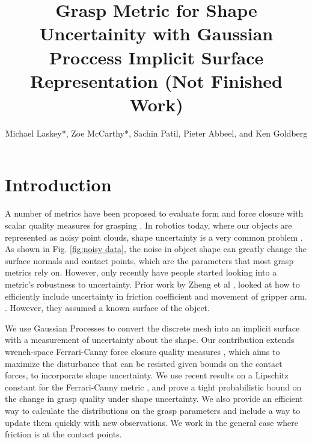 \documentclass[letterpaper, 10 pt, conference]{ieeeconf}  %
\title{\LARGE \bf
Grasp Metric for Shape Uncertainity with Gaussian Proccess Implicit Surface Representation (Not Finished Work) }
\author{Michael Laskey*, Zoe McCarthy*, Sachin Patil, Pieter Abbeel, and Ken Goldberg}%
\begin{document}
\maketitle
\thispagestyle{empty}
\pagestyle{empty}





\section{Introduction}

\vspace{10pt}
 A number of metrics have been proposed to evaluate form and force closure with scalar quality measures for grasping \cite{bicchi2000}.  In robotics today, where our objects are represented as noisy point clouds, shape uncertainty is a very common problem \cite{singhbigbird}. As shown in Fig. \ref{fig:noisy data}, the noise in object shape can greatly change the surface normals and contact points, which are the parameters that most grasp metrics rely on.  However, only recently have people started looking into a metric's robustness to uncertainty. Prior work by Zheng et al \cite{zheng2005}, looked at how to efficiently include uncertainty in friction coefficient and movement of gripper arm. . However, they assumed a known surface of the object.
 
 We use Gaussian Processes \cite{rasmussen2006} to convert the discrete mesh into an implicit surface with a measurement of uncertainty about the shape. Our contribution extends wrench-space Ferrari-Canny force closure quality measures \cite{ferrari1992}, which aims to maximize the disturbance that can be resisted given bounds on the contact forces, to incorporate shape uncertainty. We use recent results on a Lipschitz  constant for the Ferrari-Canny metric \cite{pokorny2013classical}, and prove a tight probabilistic bound on the change in grasp quality under shape uncertainty. We also provide an efficient way to calculate the distributions on the grasp parameters and include a way to update them quickly with new observations. We work in the general case where friction is at the contact points. 
\end{document}
